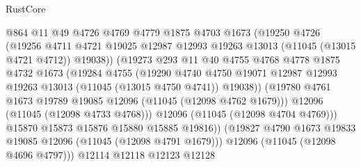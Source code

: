 \begin{lexlean}{RustCore}
\begin{coremodule}
                            @864
                            @11
                            @49
                            @4726
                            @4769
                            @4779
                            @1875
                            @4703
                            @1673
                            (@19250
                              @4726
                              (@19256
                                @4711
                                @4721
                                @19025
                                @12987
                                @12993
                                @19263
                                @13013
                                (@11045 (@13015 @4721 @4712))
                                @19038))
                            (@19273
                              @293
                              @11
                              @40
                              @4755
                              @4768
                              @4778
                              @1875
                              @4732
                              @1673
                              (@19284
                                @4755
                                (@19290
                                  @4740
                                  @4750
                                  @19071
                                  @12987
                                  @12993
                                  @19263
                                  @13013
                                  (@11045 (@13015 @4750 @4741))
                                  @19038))
                              (@19780
                                @4761
                                @1673
                                @19789
                                @19085
                                @12096
                                (@11045 (@12098 @4762 @1679)))
                              @12096
                              (@11045 (@12098 @4733 @4768)))
                            @12096
                            (@11045 (@12098 @4704 @4769)))
                          @15870
                          @15873
                          @15876
                          @15880
                          @15885
                          @19816))
                      (@19827 @4790 @1673 @19833 @19085 @12096 (@11045 (@12098 @4791 @1679)))
                      @12096
                      (@11045 (@12098 @4696 @4797)))
                    @12114
                    @12118
                    @12123
                    @12128

\end{coremodule}
\end{lexlean}
